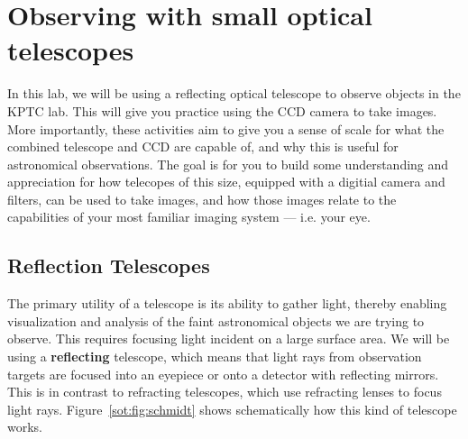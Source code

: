 \chapter{Observing with small optical telescopes}

In this lab, we will be using a reflecting optical telescope to observe objects in the KPTC
lab. This will give you practice using the CCD camera to take images. More importantly,
these activities aim to give you a sense of scale for what the combined telescope and CCD are
capable of, and why this is useful for astronomical observations. The goal is for you to build some
understanding and appreciation for how telecopes of this size, equipped with a digitial camera and
filters, can be used to take images, and how those images relate to the capabilities of your most
familiar imaging system --- i.e. your eye.


\section{Reflection Telescopes}

The primary utility of a telescope is its ability to gather light, thereby enabling visualization and analysis of the faint astronomical objects we are trying to observe. This requires focusing light incident on a large surface area. We will be using a \textbf{reflecting} telescope, which means that light rays from observation targets are focused into an eyepiece or onto a detector with reflecting mirrors. This is in contrast to refracting telescopes, which use refracting lenses to focus light rays. Figure~\ref{sot:fig:schmidt} shows schematically how this kind of telescope works. 

